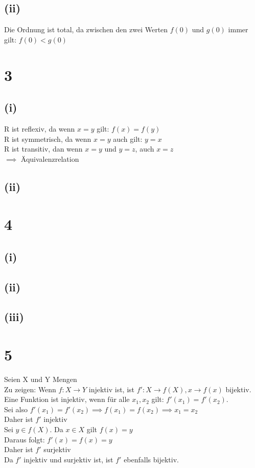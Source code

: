 \documentclass{article}
\begin{document}
\subsection{(ii)}
Die Ordnung ist total, da zwischen den zwei Werten $f(0)$ und $g(0)$ immer gilt: $f(0) < g(0)$

\section{3}
\subsection{(i)}
R ist reflexiv, da wenn $x = y$ gilt: $f(x) = f(y)$ \\
R ist symmetrisch, da wenn $x = y$ auch gilt: $y = x$ \\
R ist transitiv, dan wenn $x = y$ und $y = z$, auch $x = z$ \\
$\implies$ Äquivalenzrelation
\subsection{(ii)}

\section{4}
\subsection{(i)}
\subsection{(ii)}
\subsection{(iii)}

\section{5}
Seien X und Y Mengen \\
Zu zeigen: Wenn $f:X \rightarrow Y$ injektiv ist, ist $f':X \rightarrow f(X), x\rightarrow f(x)$ bijektiv. \\ 
Eine Funktion ist injektiv, wenn für alle $x_1, x_2$ gilt: $f'(x_1)=f'(x_2)$. \\
Sei also $f'(x_1) = f'(x_2) \implies f(x_1) = f(x_2) \implies x_1 = x_2$  \\
Daher ist $f'$ injektiv \\
Sei $y \in f(X)$. Da $x \in X$ gilt $f(x)=y$ \\
Daraus folgt: $f'(x) = f(x) = y$ \\
Daher ist $f'$ surjektiv \\
Da $f'$ injektiv und surjektiv ist, ist $f'$ ebenfalls bijektiv. \\
\end{document}
